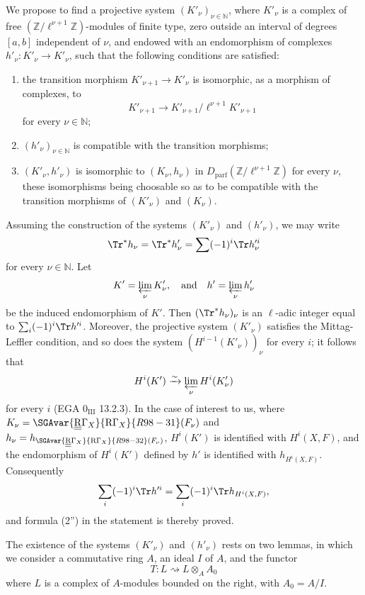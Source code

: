 We propose to find a projective system $(K'_\nu)_{\nu\in\mathbb N}$, where $K'_\nu$ is a complex of free $(\mathbb Z/\ell^{\nu+1}\mathbb Z)$-modules of finite type, zero outside an interval of degrees $[a,b]$ independent of $\nu$, and endowed with an endomorphism of complexes $h'_\nu:K'_\nu\to K'_\nu$, such that the following conditions are satisfied:
\begin{enumerate}[label=\arabic*)]
\item the transition morphism $K'_{\nu+1}\to K'_\nu$ is isomorphic, as a morphism of complexes, to
\[
K'_{\nu+1}\to K'_{\nu+1}/\ell^{\nu+1}K'_{\nu+1}
\]
for every $\nu\in\mathbb N$;
\item $(h'_\nu)_{\nu\in\mathbb N}$ is compatible with the transition morphisms;
\item $(K'_\nu,h'_\nu)$ is isomorphic to $(K_\nu,h_\nu)$ in $D_{\mathrm{parf}}(\mathbb Z/\ell^{\nu+1}\mathbb Z)$ for every $\nu$, these isomorphisms being choosable so as to be compatible with the transition morphisms of $(K'_\nu)$ and $(K_\nu)$.
\end{enumerate}
Assuming the construction of the systems $(K'_\nu)$ and $(h'_\nu)$, we may write
\[
\Tr^*h_\nu=\Tr^*h'_\nu=\sum(-1)^i\Tr h_\nu'^i
\]
for every $\nu\in\mathbb N$. Let
\[
K'=\varprojlim_\nu K'_\nu,
\quad\text{and}\quad h'=\varprojlim_\nu h'_\nu
\]
be the induced endomorphism of $K'$. Then $(\Tr^*h_\nu)_\nu$ is an $\ell$-adic integer equal to $\sum_i(-1)^i\Tr h'^i$. Moreover, the projective system $(K'_\nu)$ satisfies the Mittag-Leffler condition, and so does the system $(H^{i-1}(K'_\nu))_\nu$ for every $i$; it follows that
\[
H^i(K')\xrightarrow{\sim}\varprojlim_\nu H^i(K'_\nu)
\]
for every $i$ (EGA $0_{\mathrm{III}}$ 13.2.3). In the case of interest to us, where $K_\nu=\SGAvar{\underline{\underline{\mathrm{R}}}\Gamma_X}{\mathrm{R}\Gamma_X}{R98-31}(F_\nu)$ and $h_\nu=h_{\SGAvar{\underline{\underline{\mathrm{R}}}\Gamma_X}{\mathrm{R}\Gamma_X}{R98-32}(F_\nu)}$, $H^i(K')$ is identified with $H^i(X,F)$, and the endomorphism of $H^i(K')$ defined by $h'$ is identified with $h_{H^i(X,F)}$. Consequently
\[
\sum_i(-1)^i\Tr h'^i=
\sum_i(-1)^i\Tr h_{H^i(X,F)},
\]
and formula (2'') in the statement is thereby proved.

The existence of the systems $(K'_\nu)$ and $(h'_\nu)$ rests on two lemmas, in which we consider a commutative ring $A$, an ideal $I$ of $A$, and the functor
\[
T:L\rightsquigarrow L\otimes_A A_0
\]
where $L$ is a complex of $A$-modules bounded on the right, with $A_0=A/I$.

